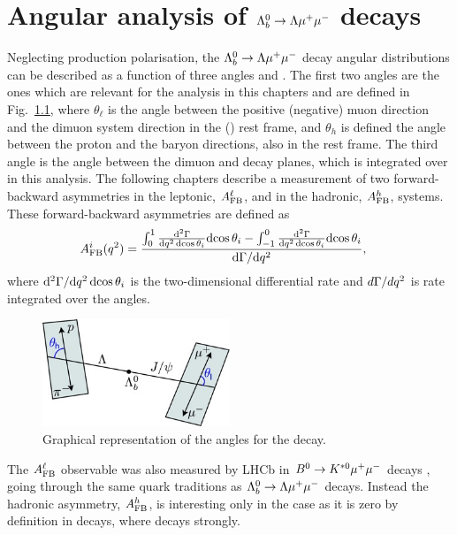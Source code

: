 \chapter{Angular analysis of $\Lambda^0_b\rightarrow\Lambda\mu^+\mu^-$ decays}
\label{sec:ang_ana}

Neglecting \Lb production polarisation, the $\Lambda^0_b\rightarrow\Lambda\mu^+\mu^-$ decay angular distributions can be described 
as a function of three angles and \qsq. The first two angles are the ones which are relevant for the
analysis in this chapters and are defined in Fig.~\ref{fig:Lb_angles}, where $\theta_\ell$ is the angle between 
the positive (negative) muon direction and the dimuon system direction in the \Lb (\Lbbar) rest frame,
and $\theta_h$ is defined the angle between the proton and the \Lz baryon directions, also in the
\Lb rest frame. The third angle is the angle between the dimuon and \Lz decay planes, which is integrated
over in this analysis. %
The following chapters describe a measurement of two forward-backward asymmetries in the leptonic,
$A_{\rm FB}^\ell$, and in the hadronic, $A_{\rm FB}^h$, systems. These forward-backward asymmetries
are defined as
\begin{align}
A_{\rm FB}^i(q^2)&=\frac{\int_0^1 \frac{\mathrm{d}^2\Gamma}{\mathrm{d}q^2\,\mathrm{d}\!\cos\theta_i} \mathrm{d}\!\cos\theta_i-
               \int^0_{-1} \frac{\mathrm{d}^2\Gamma}{\mathrm{d}q^2\,\mathrm{d}\!\cos\theta_i} \mathrm{d}\!\cos\theta_i}{\mathrm{d}\Gamma / \mathrm{d} q^2},
\label{eq:afbTh}
\end{align}
where $\mathrm{d}^2\Gamma/\mathrm{d} q^2\,\mathrm{d}\!\cos\theta_i$ is the two-dimensional differential rate and
$d\Gamma / dq^2$ is rate integrated over the angles. 

\begin{figure}[h!]
\centering
\includegraphics[width=0.5\textwidth]{Lmumu/figs/angles.jpeg}
\caption{Graphical representation of the angles for the \decay{\Lb}{\Lz\mumu} decay.}
\label{fig:Lb_angles}
\end{figure}

The $A_{\rm FB}^\ell$ observable was also measured by LHCb in $B^0\rightarrow K^{*0}\mu^+\mu^-$ decays ,
going through the same quark traditions as $\Lambda^0_b\rightarrow\Lambda\mu^+\mu^-$ decays. Instead the hadronic
asymmetry, $A_{\rm FB}^h$, is interesting only in the \Lb case as it is zero by definition
in \Bz decays, where \Kstarz decays strongly.

